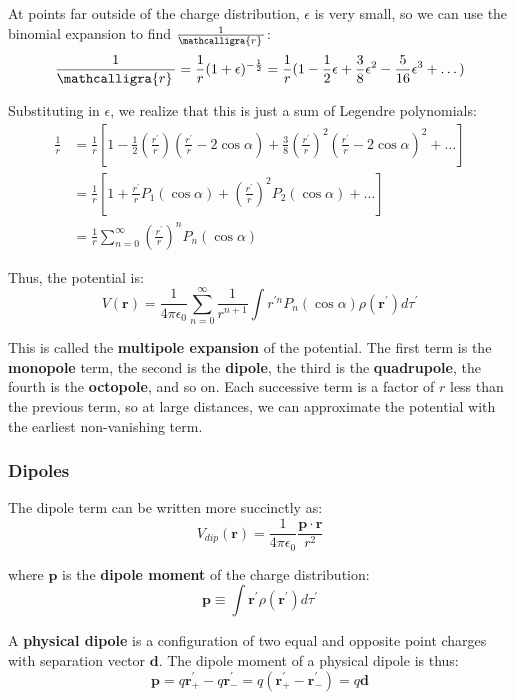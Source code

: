 \documentclass{article}
\newcommand{\scriptr}{\mathcalligra{r}\,}
\begin{document}
At points far outside of the charge distribution, \(\epsilon \) is very small, so we can use the binomial expansion to find \(\frac{1}{\scriptr}\):
\[
    \frac{1}{\scriptr}=\frac{1}{r}(1+\epsilon)^{-\frac{1}{2}}=\frac{1}{r}(1-\frac{1}{2}\epsilon+\frac{3}{8}\epsilon^2-\frac{5}{16}\epsilon^3+\dots)
\]  

Substituting in \(\epsilon\), we realize that this is just a sum of Legendre polynomials:
\begin{align*}
    \frac{1}{r}&=\frac{1}{r}[1-\frac{1}{2}(\frac{r^{\prime} }{r})(\frac{r^{\prime} }{r}-2 \cos \alpha )+\frac{3}{8}(\frac{r^{\prime} }{r})^2(\frac{r^{\prime} }{r}-2 \cos \alpha )^2+\dots] \\
    &=\frac{1}{r}[1+\frac{r^{\prime} }{r}P_1(\cos \alpha )+(\frac{r^{\prime} }{r})^2P_2(\cos \alpha )+\dots]\\
    &=\frac{1}{r}\sum_{n=0}^{\infty }(\frac{r^{\prime} }{r})^n P_n(\cos \alpha )
\end{align*}

Thus, the potential is:
\[
    V(\mathbf{r} )=\frac{1}{4 \pi \epsilon_0}\sum_{n=0}^{\infty }\frac{1}{r^{n+1}} \int r^{\prime n}P_n (\cos \alpha )\rho(\mathbf{r}^{\prime}) d \tau^{\prime} 
\]

This is called the \textbf{multipole expansion} of the potential. The first term is the \textbf{monopole} term, the second is the \textbf{dipole}, 
the third is the \textbf{quadrupole}, the fourth is the \textbf{octopole}, and so on. Each successive term is a factor of \(r\) less than the previous term, so at large distances, 
we can approximate the potential with the earliest non-vanishing term.


\subsubsection{Dipoles}
The dipole term can be written more succinctly as:
\[
    V_{dip}(\mathbf{r})=\frac{1}{4 \pi \epsilon_0}\frac{\mathbf{p} \cdot \mathbf{\hat{r}} }{r^2}
\]

where \(\mathbf{p} \) is the \textbf{dipole moment} of the charge distribution:
\[
    \mathbf{p} \equiv \int \mathbf{r}^{\prime} \rho (\mathbf{r}^{\prime} )d \tau ^{\prime} 
\] 

A \textbf{physical dipole} is a configuration of two equal and opposite point charges with separation vector \(\mathbf{d}\). The dipole moment 
of a physical dipole is thus:
\[
    \mathbf{p}=q \mathbf{r}^{\prime}_+-q \mathbf{r}^{\prime} _-=q(\mathbf{r}^{\prime} _+-\mathbf{r}^{\prime}_-)=q \mathbf{d} 
\]
\end{document}
